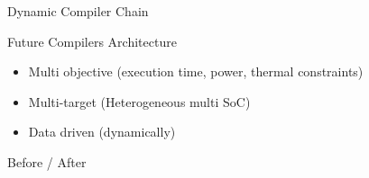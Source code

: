 %
\begin{Frame}{Dynamic Compiler Chain}
      \begin{block}{Future Compilers Architecture}
        \begin{itemize}
        \item Multi objective (execution time, power, thermal constraints)
        \item Multi-target (Heterogeneous multi SoC)
        \item Data driven (dynamically)
        \end{itemize}
      \end{block} 
      \begin{block}{Before / After}
      \end{block}   
\end{Frame}


